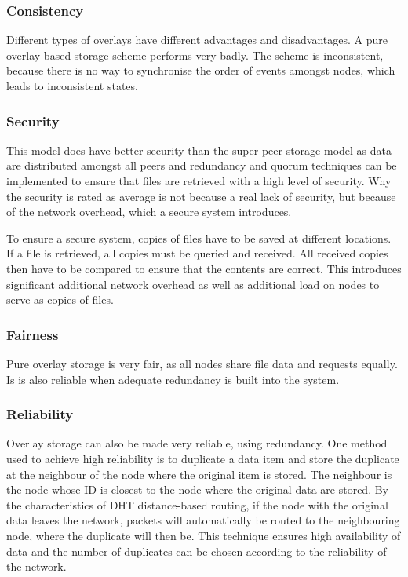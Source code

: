\documentclass[journal,oneside,a4paper,onecolumn]{IEEEtran}
\begin{document}
\subsubsection{Consistency}
Different types of overlays have different advantages and disadvantages. A pure overlay-based storage scheme performs very badly. The scheme is inconsistent, because there is no way to synchronise the order of events amongst nodes, which leads to inconsistent states.

\subsubsection{Security}
This model does have better security than the super peer storage model as data are distributed amongst all peers and redundancy and quorum techniques can be implemented to ensure that files are retrieved with a high level of security. Why the security is rated as average is not because a real lack of security, but because of the network overhead, which a secure system introduces.

To ensure a secure system, copies of files have to be saved at different locations. If a file is retrieved, all copies must be queried and received. All received copies then have to be compared to ensure that the contents are correct. This introduces significant additional network overhead as well as additional load on nodes to serve as copies of files.

\subsubsection{Fairness}
Pure overlay storage is very fair, as all nodes share file data and requests equally. Is is also reliable when adequate redundancy is built into the system.

\subsubsection{Reliability}
Overlay storage can also be made very reliable, using redundancy. One method used to achieve high reliability is to duplicate a data item and store the duplicate at the neighbour of the node where the original item is stored. The neighbour is the node whose ID is closest to the node where the original data are stored. By the characteristics of DHT distance-based routing, if the node with the original data leaves the network, packets will automatically be routed to the neighbouring node, where the duplicate will then be. This technique ensures high availability of data and the number of duplicates can be chosen according to the reliability of the network.
\end{document}
